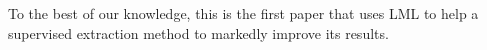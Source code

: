 \documentclass[11pt,a4paper]{article}
\theoremstyle{definition}
\newtheorem{defn}{Definition}
\begin{document}

To the best of our knowledge, this is the first paper that uses LML to help a supervised extraction method to markedly improve its results.  






\end{document}
